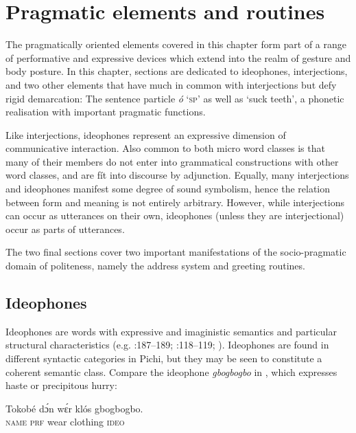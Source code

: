 \chapter{Pragmatic elements and routines}

The pragmatically oriented elements covered in this chapter form part of a range of performative and expressive devices which extend into the realm of gesture and body posture. In this chapter, sections are dedicated to ideophones, interjections, and two other elements that have much in common with interjections but defy rigid demarcation: The sentence particle \textit{ó} ‘\textsc{sp}’ as well as ‘suck teeth’, a phonetic realisation with important pragmatic functions. 


Like interjections, ideophones represent an expressive dimension of communicative interaction. Also common to both micro word classes is that many of their members do not enter into grammatical constructions with other word classes, and are fít into discourse by adjunction. Equally, many interjections and ideophones manifest some degree of sound symbolism, hence the relation between form and meaning is not entirely arbitrary. However, while interjections can occur as utterances on their own, ideophones (unless they are interjectional) occur as parts of utterances. 



The two final sections cover two important manifestations of the socio-pragmatic domain of politeness, namely the address system and greeting routines. 


\section{Ideophones}\label{sec:12.1}

Ideophones are words with expressive and imaginistic semantics and particular structural characteristics (e.g. \citealt{Westermann1930}:187–189; \citealt{Doke1935}:118–119; \citealt{Dingemanse2017}). Ideophones are found in different syntactic categories in Pichi, but they may be seen to constitute a coherent semantic class. Compare the ideophone \textit{gbogbogbo} in , which expresses haste or precipitous hurry: 


\ea%
    \label{ex:key:1613}
    \gll Tokobé  dɔ́n  wɛ́r    klós    gbogbogbo.\\
\textsc{name}  \textsc{prf}  wear  clothing  \textsc{ideo}\\


